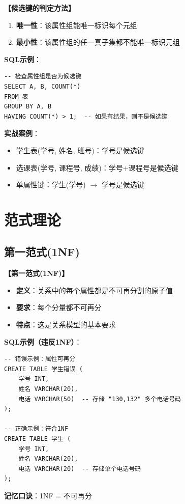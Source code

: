 \documentclass[12pt, a4paper]{article}
\newenvironment{bluebox}[1]{%
  \begin{trivlist}
  \item[\hskip\labelsep \textbf{#1}]
  \setlength{\parskip}{0.5ex}
  \setlength{\itemsep}{0.5ex}
}{%
  \end{trivlist}
  }
\begin{document}
\begin{bluebox}{候选键判定}
	\textbf{【候选键的判定方法】}

	\begin{enumerate}[leftmargin=*, label=\textbf{\arabic*.}]
		\item \textbf{唯一性}：该属性组能唯一标识每个元组
		\item \textbf{最小性}：该属性组的任一真子集都不能唯一标识元组
	\end{enumerate}

	\textbf{SQL示例}：
	\begin{verbatim}
-- 检查属性组是否为候选键
SELECT A, B, COUNT(*) 
FROM 表 
GROUP BY A, B 
HAVING COUNT(*) > 1;  -- 如果有结果，则不是候选键
	\end{verbatim}

	\textbf{实战案例}：
	\begin{itemize}
		\item 学生表(学号, 姓名, 班号)：学号是候选键
		\item 选课表(学号, 课程号, 成绩)：学号+课程号是候选键
		\item 单属性键：学生(学号) $\to$ 学号是候选键
	\end{itemize}
\end{bluebox}

\section{范式理论}

\subsection{第一范式(1NF)}

\begin{bluebox}{1NF定义}
	\textbf{【第一范式(1NF)】}

	\begin{itemize}[leftmargin=*, nosep]
		\item \textbf{定义}：关系中的每个属性都是不可再分割的原子值
		\item \textbf{要求}：每个分量都不可再分
		\item \textbf{特点}：这是关系模型的基本要求
	\end{itemize}

	\textbf{SQL示例（违反1NF）}：
	\begin{verbatim}
-- 错误示例：属性可再分
CREATE TABLE 学生错误 (
    学号 INT,
    姓名 VARCHAR(20),
    电话 VARCHAR(50)  -- 存储 "130,132" 多个电话号码
);

-- 正确示例：符合1NF
CREATE TABLE 学生 (
    学号 INT,
    姓名 VARCHAR(20),
    电话 VARCHAR(20)  -- 存储单个电话号码
);
	\end{verbatim}

	\textbf{记忆口诀}：1NF = 不可再分
\end{bluebox}
\end{document}
